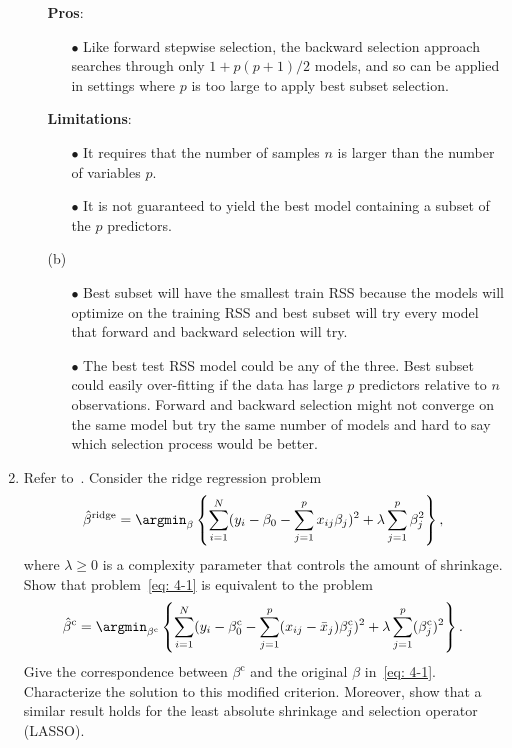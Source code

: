 \documentclass[10pt]{article}
\begin{document}
\begin{enumerate}[1.]
\begin{itemize}
	\textbf{Pros}: 
\begin{itemize}
	\item[$\bullet$] Like forward stepwise selection, the backward selection approach searches
through only $1+p(p+1)/2$ models, and so can be applied in settings where
$p$ is too large to apply best subset selection.
\end{itemize}  

\textbf{Limitations}: 
\begin{itemize}
	\item[$\bullet$] It requires that the number of samples $n$ is larger than
the number of variables $p$.
	
	\item[$\bullet$] It is not guaranteed to yield the best
model containing a subset of the $p$ predictors.
\end{itemize}    

    	 	\item[(b)] 
    	 	\begin{itemize}
    	 		\item[$\bullet$] Best subset will have the smallest train \textrm{RSS} because the models will optimize on the training \textrm{RSS} and best subset will try every model that forward and backward selection will try.
    	 		
    	 		\item[$\bullet$] The best test \textrm{RSS} model could be any of the three. Best subset could easily over-fitting if the data has large $p$ predictors relative to $n$ observations. Forward and backward selection might not converge on the same model but try the same number of models and hard to say which selection process would be better. 
    	 	\end{itemize}
    	 \end{itemize}
        
        \item Refer to~\cite[Ex. 3.5]{hastie2009elements}. Consider the ridge regression problem
        \begin{equation}\label{eq: 4-1}
        	\hat{\beta}^{\textrm{ridge}} = \argmin_{\beta}\left\lbrace\sum_{i=1}^{N}(y_i - \beta_{0} - \sum_{j=1}^{p}x_{ij}\beta_{j})^{2} + \lambda \sum_{j=1}^{p}\beta_{j}^{2}\right\rbrace, 
        \end{equation}
        where $\lambda \geq 0$ is a complexity parameter that controls the amount of shrinkage. Show that problem~\eqref{eq: 4-1} is equivalent to the problem
        \begin{equation}\label{eq: 4-2}
        	\hat{\beta}^{\textrm{c}} = \argmin_{\beta^{\textrm{c}}}\left\lbrace\sum_{i=1}^{N}(y_i - \beta_{0}^{\textrm{c}} - \sum_{j=1}^{p}(x_{ij}-\bar{x}_j)\beta_{j}^{\textrm{c}})^{2} + \lambda \sum_{j=1}^{p}(\beta_{j}^{\textrm{c}})^{2}\right\rbrace. 
        \end{equation}
        Give the correspondence between $\beta^{\textrm{c}}$ and the original $\beta$ in~\eqref{eq: 4-1}. Characterize the solution to this modified criterion. Moreover, show that a similar result holds for the least absolute shrinkage and selection operator (LASSO).~
        

\end{enumerate}
\end{document}
